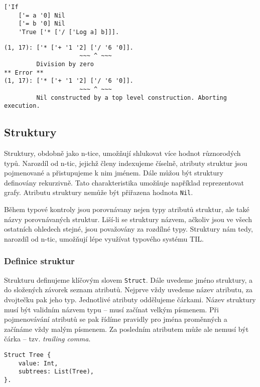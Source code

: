 \begin{lstlisting}[caption={Příklad využití Nil}]
['If
    ['= a '0] Nil
    ['= b '0] Nil
    'True ['* ['/ ['Log a] b]]].
\end{lstlisting}

\begin{lstlisting}[caption={Příklad hlášení chyby}]
(1, 17): ['* ['+ '1 '2] ['/ '6 '0]].
                     ~~~ ^ ~~~
         Division by zero
** Error **
(1, 17): ['* ['+ '1 '2] ['/ '6 '0]].
                     ~~~ ^ ~~~
         Nil constructed by a top level construction. Aborting execution.
\end{lstlisting}

\subsection{Struktury} \label{structs}

Struktury, obdobně jako n-tice, umožňují shlukovat více hodnot různorodých typů. Narozdíl od n-tic,
jejichž členy indexujeme číselně, atributy struktur jsou pojmenované a přistupujeme k nim jménem.
Dále můžou být struktury definovány rekurzivně. Tato charakteristika umožňuje například
reprezentovat grafy. Atributu struktury nemůže být přiřazena hodnota \lstinline{Nil}.

Během typové kontroly jsou porovnávany nejen typy atributů struktur, ale také názvy porovnávaných
struktur. Liší-li se struktury názvem, ačkoliv jsou ve všech ostatních ohledech stejné, jsou
považovány za rozdílné typy. Struktury nám tedy, narozdíl od n-tic, umožňují lépe využívat typového
systému TIL.

\subsubsection{Definice struktur}

Strukturu definujeme klíčovým slovem \lstinline{Struct}. Dále uvedeme jméno struktury, a do
složených závorek seznam atributů. Nejprve vždy uvedeme název atributu, za dvojtečku pak jeho typ.
Jednotlivé atributy oddělujeme čárkami. Název struktury musí být validním názvem typu -- musí
začínat velkým písmenem. Při pojmenovávání atributů se pak řídíme pravidly pro jména proměnných
a začínáme vždy malým písmenem. Za posledním atributem může ale nemusí být čárka -- tzv.
\textit{trailing comma}.

\begin{lstlisting}[caption={Příklad definice struktury}]
Struct Tree {
    value: Int,
    subtrees: List(Tree),
}.
\end{lstlisting}

